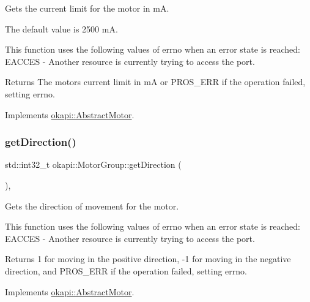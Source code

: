 Gets the current limit for the motor in mA.

The default value is 2500 mA.

This function uses the following values of errno when an error state is reached\+: E\+A\+C\+C\+ES -\/ Another resource is currently trying to access the port.

\begin{DoxyReturn}{Returns}
The motor\textquotesingle{}s current limit in mA or P\+R\+O\+S\+\_\+\+E\+RR if the operation failed, setting errno. 
\end{DoxyReturn}


Implements \mbox{\hyperlink{classokapi_1_1AbstractMotor_ab83ef3319ffe1cb1d020e5a10127aab8}{okapi\+::\+Abstract\+Motor}}.

\mbox{\label{classokapi_1_1MotorGroup_a5466d52a245b10765945b91c0194da66}} 
\subsubsection{\texorpdfstring{getDirection()}{getDirection()}}
{\footnotesize\ttfamily std\+::int32\+\_\+t okapi\+::\+Motor\+Group\+::get\+Direction (\begin{DoxyParamCaption}{ }\end{DoxyParamCaption})\hspace{0.3cm}{\ttfamily [override]}, {\ttfamily [virtual]}}

Gets the direction of movement for the motor.

This function uses the following values of errno when an error state is reached\+: E\+A\+C\+C\+ES -\/ Another resource is currently trying to access the port.

\begin{DoxyReturn}{Returns}
1 for moving in the positive direction, -\/1 for moving in the negative direction, and P\+R\+O\+S\+\_\+\+E\+RR if the operation failed, setting errno. 
\end{DoxyReturn}


Implements \mbox{\hyperlink{classokapi_1_1AbstractMotor_a94763d1700bd91b995333b012c0b683f}{okapi\+::\+Abstract\+Motor}}.

\mbox{\label{classokapi_1_1MotorGroup_a16413d00d77dd73b4977e8b7f73a33ce}} 

